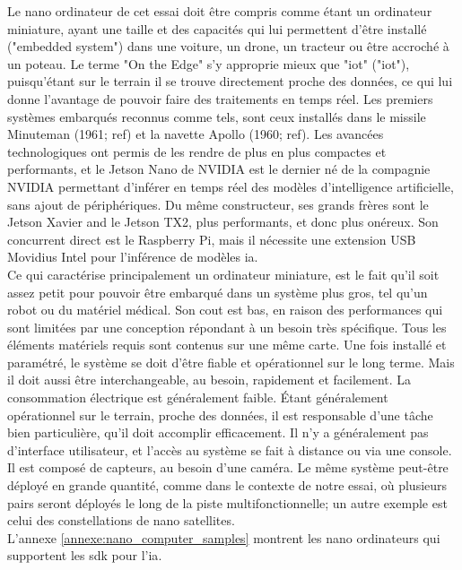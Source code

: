 ﻿\noindent Le nano ordinateur de cet essai doit être compris comme étant un ordinateur miniature, ayant une taille et des capacités qui lui permettent d'être installé ("embedded system") dans une voiture, un drone, un tracteur ou être accroché à un poteau. Le terme "On the Edge" s'y approprie mieux que "\acrshort{iot}" ("\acrlong{iot}"), puisqu'étant sur le terrain il se trouve directement proche des données, ce qui lui donne l'avantage de pouvoir faire des traitements en temps réel. Les premiers systèmes embarqués reconnus comme tels, sont ceux installés dans le missile Minuteman (1961; ref) et la navette Apollo (1960; ref). Les avancées technologiques ont permis de les rendre de plus en plus compactes et performants, et le Jetson Nano de NVIDIA est le dernier né de la compagnie NVIDIA permettant d'inférer en temps réel des modèles d'intelligence artificielle, sans ajout de périphériques. Du même constructeur, ses grands frères sont le Jetson Xavier and le Jetson TX2, plus performants, et donc plus onéreux. Son concurrent direct est le Raspberry Pi, mais il nécessite une extension USB Movidius Intel pour l'inférence de modèles \acrshort{ia}. 
\vspace{\baselineskip}
\\
\noindent Ce qui caractérise principalement un ordinateur miniature, est le fait qu'il soit assez petit pour pouvoir être embarqué dans un système plus gros, tel qu'un robot ou du matériel médical. Son cout est bas, en raison des performances qui sont limitées par une conception répondant à un besoin très spécifique. Tous les éléments matériels requis sont contenus sur une même carte.  Une fois installé et paramétré, le système se doit d'être fiable et opérationnel sur le long terme. Mais il doit aussi être interchangeable, au besoin, rapidement et facilement. La consommation électrique est généralement faible. Étant généralement opérationnel sur le terrain, proche des données, il est responsable d'une tâche bien particulière, qu'il doit accomplir efficacement. Il n'y a généralement pas d'interface utilisateur, et l'accès au système se fait à distance ou via une console. Il est composé de capteurs, au besoin d'une caméra. Le même système peut-être déployé en grande quantité, comme dans le contexte de notre essai, où plusieurs pairs seront déployés le long de la piste multifonctionnelle; un autre exemple est celui des constellations de nano satellites.
\vspace{\baselineskip}
\\
\noindent L'annexe \ref{annexe:nano_computer_samples} montrent les nano ordinateurs qui supportent les \acrshort{sdk} pour l'\acrshort{ia}.
